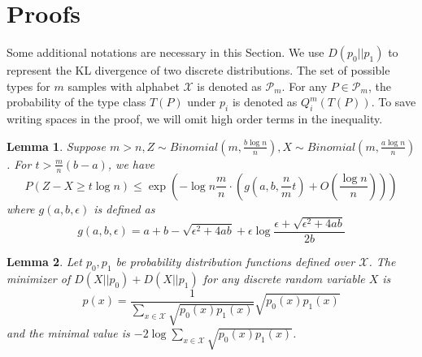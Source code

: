 \documentclass[conference]{IEEEtran}
\newtheorem{lemma}{Lemma}
\begin{document}
	\section{Proofs}
	Some additional notations are necessary in this Section. We use
	$D(p_0||p_1)$ to represent the KL divergence of two discrete distributions. The set of possible types
	for $m$ samples with alphabet $\mathcal{X}$ is denoted as $\mathcal{P}_m$. For any $P\in \mathcal{P}_m$, the probability of the type
	class $T(P)$ under $p_i$ is denoted as $Q_i^{m}(T(P))$.
	To save writing spaces in the proof, we will omit high order terms in the inequality.
	\begin{lemma}\label{lem:zxt}
		Suppose $m > n, Z \sim Binomial(m, \frac{b\log n}{n}), X\sim Binomial(m, \frac{a\log n}{n})$.
		For $ t > \frac{m}{n}(b - a)$, we have
		\begin{equation}
		P(Z - X \geq t \log n) \leq \exp(-\log n \frac{m}{n}\cdot ( g(a, b, \frac{n}{m}t) + O(\frac{\log n}{n})))
		\end{equation}
		where $g(a,b,\epsilon)$ is defined as
		\begin{equation}\label{eq:gab}
		g(a,b,\epsilon) = a + b - \sqrt{\epsilon^2 + 4ab} + \epsilon \log \frac{\epsilon + \sqrt{\epsilon^2 + 4ab}}{2b}
		\end{equation}
	\end{lemma}
	\begin{lemma}\label{lem:p0p12}
		Let $p_0, p_1$ be probability distribution functions defined over $\mathcal{X}$. The minimizer
		of $D(X||p_0) + D(X||p_1)$ for any discrete random variable $X$ is
		\begin{equation}\label{eq:p012}
		p(x)=\frac{1}{ \sum_{x\in \mathcal{X}} \sqrt{p_0(x) p_1(x)}}\sqrt{p_0(x)p_1(x)}
		\end{equation}
		and the minimal value is
		$-2\log \sum_{x\in \mathcal{X}} \sqrt{p_0(x) p_1(x)}$.
	\end{lemma}
\end{document}
